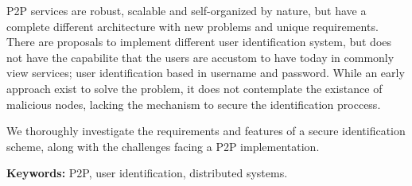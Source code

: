 

P2P services are robust, scalable and self-organized by nature, but have a
complete different architecture with new problems and unique requirements.
There are proposals to implement different user identification system, but does
not have the capabilite that the users are accustom to have today in commonly
view services; user identification based in username and password. While an
early approach exist to solve the problem, it does not contemplate the existance
of malicious nodes, lacking the mechanism to secure the identification
proccess.

 We thoroughly investigate the requirements and features of a secure
identification scheme, along with the challenges facing a P2P implementation.





{\bf Keywords:} P2P, user identification, distributed systems.
